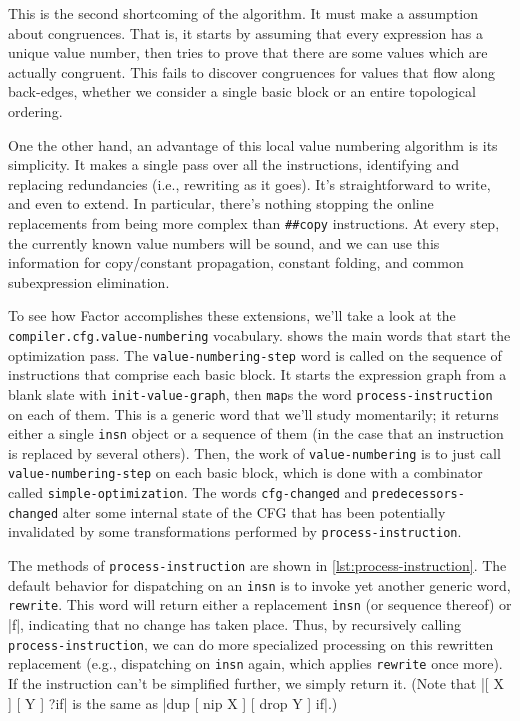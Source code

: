 This is the second shortcoming of the algorithm.  It must make a
 assumption about congruences.  That is, it starts by
assuming that every expression has a unique value number, then tries to prove
that there are some values which are actually congruent.  This fails to
discover congruences for values that flow along back-edges, whether we consider
a single basic block or an entire topological ordering.

One the other hand, an advantage of this local value numbering algorithm is its
simplicity.  It makes a single pass over all the instructions, identifying and
replacing redundancies  (i.e., rewriting as it goes).  It's
straightforward to write, and even to extend.  In particular, there's nothing
stopping the online replacements from being more complex than \Verb|##copy|
instructions.  At every step, the currently known value numbers will be sound,
and we can use this information for copy/constant propagation, constant
folding, and common subexpression elimination.


\begin{sloppypar}
To see how Factor accomplishes these extensions, we'll take a look at the
\Verb|compiler.cfg.value-numbering| vocabulary.
 shows the main words that start the
optimization pass.  The \Verb|value-numbering-step| word is called on the
sequence of instructions that comprise each basic block.  It starts the
expression graph from a blank slate with \Verb|init-value-graph|, then
\Verb|map|s the word \Verb|process-instruction| on each of them.  This is a
generic word that we'll study momentarily; it returns either a single
\Verb|insn| object or a sequence of them (in the case that an instruction is
replaced by several others).  Then, the work of \Verb|value-numbering| is to
just call \Verb|value-numbering-step| on each basic block, which is done with a
combinator called \Verb|simple-optimization|.  The words \Verb|cfg-changed| and
\Verb|predecessors-changed| alter some internal state of the \gls{CFG} that has
been potentially invalidated by some transformations performed by
\Verb|process-instruction|.
\end{sloppypar}


The methods of \Verb|process-instruction| are shown in
\vref{lst:process-instruction}.  The default behavior for dispatching on an
\Verb|insn| is to invoke yet another generic word, \Verb|rewrite|.  This word
will return either a replacement \Verb|insn| (or sequence thereof) or
\factor|f|, indicating that no change has taken place.  Thus, by recursively
calling \Verb|process-instruction|, we can do more specialized processing on
this rewritten replacement (e.g., dispatching on \Verb|insn| again, which
applies \Verb|rewrite| once more).  If the instruction can't be simplified
further, we simply return it.  (Note that
%
\factor|[ X ] [ Y ] ?if|
%
is the same as
%
\factor|dup [ nip X ] [ drop Y ] if|.)

